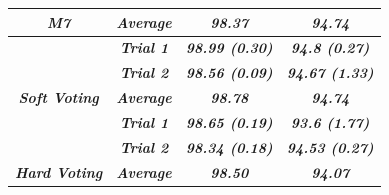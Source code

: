 \documentclass{article}
\begin{document}
\begin{table}[]
\begin{tabular}{|c|c|cc|}
\multirow{-3}{*}{\textit{\textbf{M7}}}          & \textit{\textbf{Average}} & \multicolumn{1}{c|}{\textit{\textbf{98.37}}}                        & {\color[HTML]{333333} \textit{\textbf{94.74}}} \\ \hline
                                                & \textit{\textbf{Trial 1}} & \multicolumn{1}{c|}{\textit{\textbf{98.99 (0.30)}}}                 & \textit{\textbf{94.8 (0.27)}}                  \\ \cline{2-4} 
                                                & \textit{\textbf{Trial 2}} & \multicolumn{1}{c|}{\textit{\textbf{98.56 (0.09)}}}                 & \textit{\textbf{94.67 (1.33)}}                 \\ \cline{2-4} 
\multirow{-3}{*}{\textit{\textbf{Soft Voting}}} & \textit{\textbf{Average}} & \multicolumn{1}{c|}{{\color[HTML]{FE0000} \textit{\textbf{98.78}}}} & {\color[HTML]{FE0000} \textit{\textbf{94.74}}} \\ \hline
                                                & \textit{\textbf{Trial 1}} & \multicolumn{1}{c|}{\textit{\textbf{98.65 (0.19)}}}                 & \textit{\textbf{93.6 (1.77)}}                  \\ \cline{2-4} 
                                                & \textit{\textbf{Trial 2}} & \multicolumn{1}{c|}{\textit{\textbf{98.34 (0.18)}}}                 & \textit{\textbf{94.53 (0.27)}}                 \\ \cline{2-4} 
\multirow{-3}{*}{\textit{\textbf{Hard Voting}}} & \textit{\textbf{Average}} & \multicolumn{1}{c|}{\textit{\textbf{98.50}}}                        & \textit{\textbf{94.07}}                        \\ \hline
\end{tabular}
\end{table}
\end{document}
